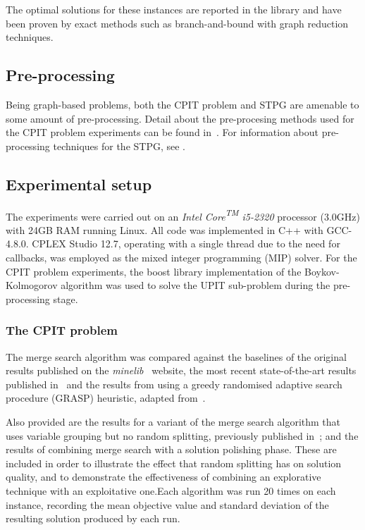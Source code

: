 \documentclass[journal]{IEEEtran}
\begin{document}
The optimal solutions for these instances are reported in the library and 
have been proven by exact methods such as branch-and-bound with graph reduction techniques.\par



\subsection{Pre-processing}
Being graph-based problems, both the CPIT problem and STPG are amenable to some amount of pre-processing. Detail about the pre-procesing methods used for the CPIT problem experiments can be found in~\cite{gecco17}. For information about pre-processing techniques for the STPG, see \cite{pp:duin,pp:uchoa,stpg-reduce}.

\subsection{Experimental setup}
The experiments were carried out on an \emph{Intel{\textsuperscript{\textregistered}} Core{\textsuperscript{TM}} i5-2320} processor (3.0GHz) with 24GB RAM running Linux. All code was implemented in C++ with GCC-4.8.0. CPLEX Studio 12.7, operating with a single thread due to the need for callbacks, was employed as the mixed integer programming (MIP) solver. For the CPIT problem experiments, the boost library implementation of the Boykov-Kolmogorov algorithm was used to solve the UPIT sub-problem during the pre-processing stage.

\subsubsection*{\textbf{The CPIT problem}}
The merge search algorithm was compared against the baselines of the original results published on the \emph{minelib}~\cite{minelib} website, the most recent state-of-the-art results published in~\cite{minelib-improved} and the results from using a greedy randomised adaptive search procedure (GRASP) heuristic, adapted from~\cite{gecco17}. 

Also provided are the results for a variant of the merge search algorithm that uses variable grouping but no random splitting, previously published in~\cite{gecco18}; and the results of combining merge search with a solution polishing phase. These are included in order to illustrate the effect that random splitting has on solution quality, and to demonstrate the effectiveness of combining an explorative technique with an exploitative one.Each algorithm was run 20 times on each instance, recording the mean objective value and standard deviation of the resulting solution produced by each run. 
\end{document}
